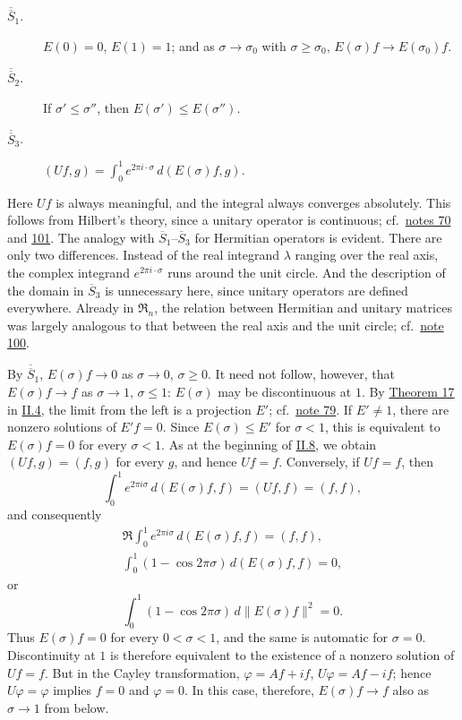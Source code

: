 \documentclass[fontsize=13pt,twoside,openany,headings=normal,parskip=false,bookmarkpackage=false,DIV=calc]{scrbook}
\begin{document}
\hypertarget{origpage-81}{}%
\begin{description}
\item[$\overline{\overline S}_1$.]\leavevmode{}\label{cond:II.Sdouble1} $E(0)=0$, $E(1)=1$; and as $\sigma\to\sigma_0$ with $\sigma\geq\sigma_0$, $E(\sigma)f\to E(\sigma_0)f$.
\item[$\overline{\overline S}_2$.]\leavevmode{}\label{cond:II.Sdouble2} If $\sigma'\leq\sigma''$, then $E(\sigma')\leq E(\sigma'')$.
\item[$\overline{\overline S}_3$.]\leavevmode{}\label{cond:II.Sdouble3} $(Uf,g)=\int_0^1e^{2\pi i\cdot\sigma}\,d(E(\sigma)f,g)$.
\end{description}
Here $Uf$ is always meaningful, and the integral always converges absolutely. This follows from Hilbert's theory, since a unitary operator is continuous; cf.\ \hyperlink{note-70}{notes 70} and \hyperlink{note-101}{101}. The analogy with $\hyperref[cond:II.Sbar1]{\overline S_1}$--$\hyperref[cond:II.Sbar3]{\overline S_3}$ for Hermitian operators is evident. There are only two differences. Instead of the real integrand $\lambda$ ranging over the real axis, the complex integrand $e^{2\pi i\cdot\sigma}$ runs around the unit circle. And the description of the domain in $\hyperref[cond:II.Sbar3]{\overline S_3}$ is unnecessary here, since unitary operators are defined everywhere. Already in $\mathfrak{R}_n$, the relation between Hermitian and unitary matrices was largely analogous to that between the real axis and the unit circle; cf.\ \hyperlink{note-100}{note 100}.

By $\hyperref[cond:II.Sdouble1]{\overline{\overline S}_1}$, $E(\sigma)f\to0$ as $\sigma\to0$, $\sigma\geq0$. It need not follow, however, that $E(\sigma)f\to f$ as $\sigma\to1$, $\sigma\leq1$: $E(\sigma)$ may be discontinuous at $1$. By \hyperref[thm:II.17]{Theorem 17} in \hyperref[sec:II.4]{II.4}, the limit from the left is a projection $E'$; cf.\ \hyperlink{note-79}{note 79}. If $E'\ne1$, there are nonzero solutions of $E'f=0$. Since $E(\sigma)\leq E'$ for $\sigma<1$, this is equivalent to $E(\sigma)f=0$ for every $\sigma<1$. As at the beginning of \hyperref[sec:II.8]{II.8}, we obtain $(Uf,g)=(f,g)$ for every $g$, and hence $Uf=f$. Conversely, if $Uf=f$, then
\[
\int_0^1e^{2\pi i\sigma}\,d(E(\sigma)f,f)=(Uf,f)=(f,f),
\]
and consequently
\begin{gather*}
\mathfrak R\int_0^1e^{2\pi i\sigma}\,d(E(\sigma)f,f)=(f,f),\\
\int_0^1(1-\cos2\pi\sigma)\,d(E(\sigma)f,f)=0,
\end{gather*}
or
\[
\int_0^1(1-\cos2\pi\sigma)\,d\|E(\sigma)f\|^2=0.
\]
Thus $E(\sigma)f=0$ for every $0<\sigma<1$, and the same is automatic for $\sigma=0$. Discontinuity at $1$ is therefore equivalent to the existence of a nonzero solution of $Uf=f$. But in the Cayley transformation, $\varphi=Af+if$, $U\varphi=Af-if$; hence $U\varphi=\varphi$ implies $f=0$ and $\varphi=0$. In this case, therefore, $E(\sigma)f\to f$ also as $\sigma\to1$ from below.
\end{document}
